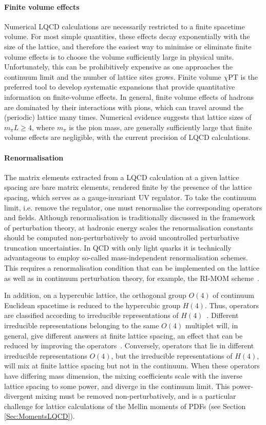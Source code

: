 \paragraph{Finite volume effects} Numerical LQCD calculations are necessarily restricted to a finite spacetime volume. For most simple quantities, these effects decay exponentially with the size of the lattice, and therefore the easiest way to minimise or eliminate finite volume effects is to choose the volume sufficiently large in physical units. Unfortunately, this can be prohibitively expensive as one approaches the continuum limit and the number of lattice sites grows. Finite volume $\chi$PT is the preferred tool to develop systematic expansions that provide quantitative information on finite-volume effects. In general, finite volume effects of hadrons are dominated by their interactions with pions, which can travel around the (periodic) lattice many times. Numerical evidence suggests that lattice sizes of $m_\pi L \geq 4$, where $m_\pi$ is the pion mass, are generally sufficiently large that finite volume effects are negligible, with the current precision of LQCD calculations.

\paragraph{Renormalisation} The matrix elements extracted from a LQCD calculation at a given lattice spacing are bare matrix elements, rendered finite by the presence of the lattice spacing, which serves as a gauge-invariant UV regulator. To take the continuum limit, i.e. remove the regulator, one must renormalise the corresponding operators and fields. Although renormalisation is traditionally discussed in the framework of perturbation theory, at hadronic energy scales the renormalisation constants should be computed non-perturbatively to avoid uncontrolled perturbative truncation uncertainties. In QCD with only light quarks it is technically advantageous to employ so-called mass-independent renormalisation schemes. This requires a renormalisation condition that can be implemented on the lattice as well as in continuum perturbation theory, for example, the RI-MOM scheme~\cite{Martinelli:1994ty}. 

In addition, on a hypercubic lattice, the orthogonal group $O(4)$ of continuum Euclidean spacetime is reduced to the hypercubic group $H(4)$. Thus, operators are classified according to irreducible representations of $H(4)$~\cite{Gockeler:1996mu}. Different irreducible representations belonging to the same $O(4)$ multiplet will, in general, give different answers at finite lattice spacing, an effect that can be reduced by improving the operators~\cite{Gockeler:2004wp}. Conversely, operators that lie in different irreducible representations $O(4)$, but the irreducible representations of $H(4)$, will mix at finite lattice spacing but not in the continuum. When these operators have differing mass dimension, the mixing coefficients scale with the inverse lattice spacing to some power, and diverge in the continuum limit. This power-divergent mixing must be removed non-perturbatively, and is a particular challenge for lattice calculations of the Mellin moments of PDFs (see Section \ref{Sec:MomentsLQCD}).

